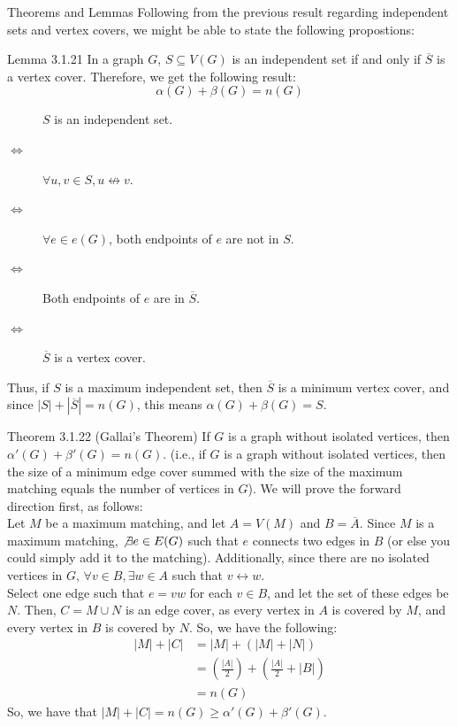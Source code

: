 \documentclass[10pt]{extarticle}
\begin{document}
  \begin{problem}{Theorems and Lemmas}
    Following from the previous result regarding independent sets and vertex covers, we might be able to state the following propostions:
    \begin{problem}{Lemma 3.1.21}
      In a graph $G$, $S\subseteq V(G)$ is an independent set if and only if $\overline{S}$ is a vertex cover. Therefore, we get the following result:
      \[
        \alpha(G) + \beta(G) = n(G)
      \] 
      \tcblower
      \begin{description}
        \item[] $S$ is an independent set.
        \item[$\Leftrightarrow$] $\forall u,v\in S, u\not\leftrightarrow v$.
        \item[$\Leftrightarrow$] $\forall e\in e(G)$, both endpoints of $e$ are not in $S$.
        \item[$\Leftrightarrow$] Both endpoints of $e$ are in $\overline{S}$.
        \item[$\Leftrightarrow$] $\overline{S}$ is a vertex cover.
      \end{description}
      Thus, if $S$ is a maximum independent set, then $\overline{S}$ is a minimum vertex cover, and since $|S| + |\overline{S}| = n(G)$, this means $\alpha(G) + \beta(G) = S$.
    \end{problem}
    \begin{problem}{Theorem 3.1.22 (Gallai's Theorem)}
      If $G$ is a graph without isolated vertices, then $\alpha'(G) + \beta'(G) = n(G)$. (i.e., if $G$ is a graph without isolated vertices, then the size of a minimum edge cover summed with the size of the maximum matching equals the number of vertices in $G$).
      \tcblower
      We will prove the forward direction first, as follows:\\

      Let $M$ be a maximum matching, and let $A = V(M)$ and $B = \overline{A}$. Since $M$ is a maximum matching, $\not\exists e\in E(G)$ such that $e$ connects two edges in $B$ (or else you could simply add it to the matching). Additionally, since there are no isolated vertices in $G$, $\forall v\in B, \exists w\in A$ such that $v\leftrightarrow w$. \\

      Select one edge such that $e = vw$ for each $v\in B$, and let the set of these edges be $N$. Then, $C = M\cup N$ is an edge cover, as every vertex in $A$ is covered by $M$, and every vertex in $B$ is covered by $N$. So, we have the following:
      \begin{align*}
        |M| + |C| &= |M| + (|M| + |N|) \tag*{Since $M$ and $N$ are disjoint}\\
            &= \left(\frac{|A|}{2}\right) + \left(\frac{|A|}{2} + |B|\right) \tag*{By the definition of $M$ and $N$}\\
            &= n(G)
      \end{align*}
      So, we have that $|M| + |C| = n(G) \geq \alpha'(G) + \beta'(G)$.\\


\end{problem}
\end{problem}
\end{document}
